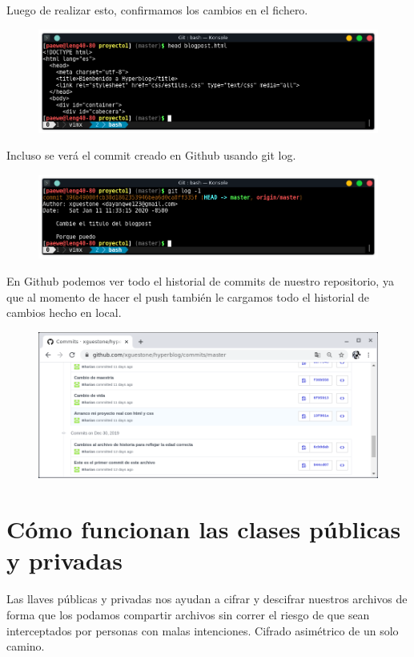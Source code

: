 \documentclass{article}
\begin{document}
Luego de realizar esto, confirmamos los cambios en el fichero.

\newpage

\begin{figure}[h!]
  \centering
  \includegraphics[scale=0.75]{./Pictures/207_local_repo_changed.png}
\end{figure}

Incluso se verá el commit creado en Github usando git log.

\begin{figure}[h!]
  \centering
  \includegraphics[scale=0.75]{./Pictures/208_last_commit.png}
\end{figure}

En Github podemos ver todo el historial de commits de nuestro repositorio, ya
que al momento de hacer el push también le cargamos todo el historial de
cambios hecho en local.

\begin{figure}[h!]
  \centering
  \includegraphics[scale=0.75]{./Pictures/209_commits_github.png}
\end{figure}


\newpage

\section{Cómo funcionan las clases públicas y privadas}%
Las llaves públicas y privadas nos ayudan a cifrar y descifrar nuestros
archivos de forma que los podamos compartir archivos sin correr el riesgo de
que sean interceptados por personas con malas intenciones. Cifrado asimétrico
de un solo camino.\\
\end{document}
